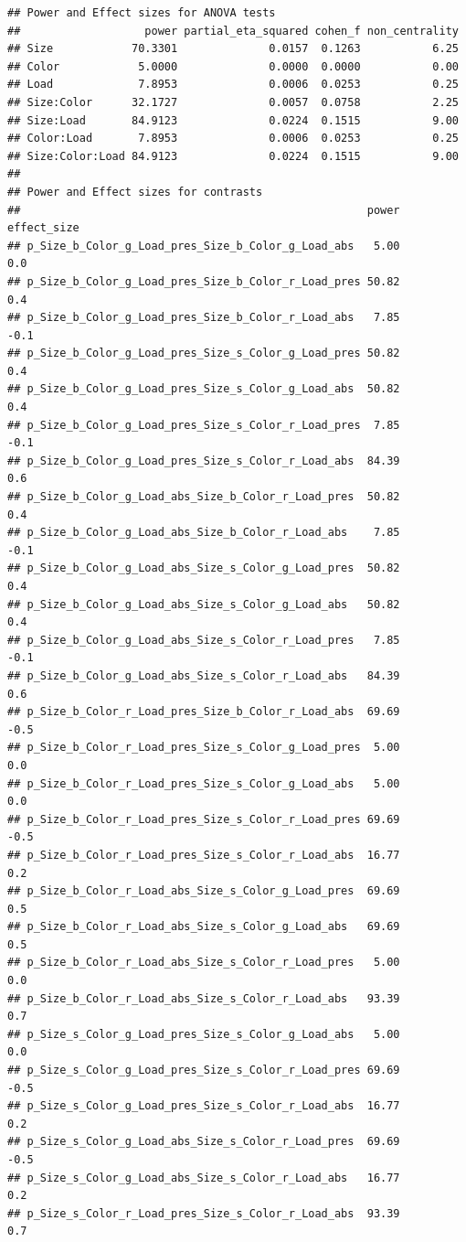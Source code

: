 \documentclass[]{book}
\begin{document}
\begin{verbatim}
## Power and Effect sizes for ANOVA tests
##                   power partial_eta_squared cohen_f non_centrality
## Size            70.3301              0.0157  0.1263           6.25
## Color            5.0000              0.0000  0.0000           0.00
## Load             7.8953              0.0006  0.0253           0.25
## Size:Color      32.1727              0.0057  0.0758           2.25
## Size:Load       84.9123              0.0224  0.1515           9.00
## Color:Load       7.8953              0.0006  0.0253           0.25
## Size:Color:Load 84.9123              0.0224  0.1515           9.00
## 
## Power and Effect sizes for contrasts
##                                                     power effect_size
## p_Size_b_Color_g_Load_pres_Size_b_Color_g_Load_abs   5.00         0.0
## p_Size_b_Color_g_Load_pres_Size_b_Color_r_Load_pres 50.82         0.4
## p_Size_b_Color_g_Load_pres_Size_b_Color_r_Load_abs   7.85        -0.1
## p_Size_b_Color_g_Load_pres_Size_s_Color_g_Load_pres 50.82         0.4
## p_Size_b_Color_g_Load_pres_Size_s_Color_g_Load_abs  50.82         0.4
## p_Size_b_Color_g_Load_pres_Size_s_Color_r_Load_pres  7.85        -0.1
## p_Size_b_Color_g_Load_pres_Size_s_Color_r_Load_abs  84.39         0.6
## p_Size_b_Color_g_Load_abs_Size_b_Color_r_Load_pres  50.82         0.4
## p_Size_b_Color_g_Load_abs_Size_b_Color_r_Load_abs    7.85        -0.1
## p_Size_b_Color_g_Load_abs_Size_s_Color_g_Load_pres  50.82         0.4
## p_Size_b_Color_g_Load_abs_Size_s_Color_g_Load_abs   50.82         0.4
## p_Size_b_Color_g_Load_abs_Size_s_Color_r_Load_pres   7.85        -0.1
## p_Size_b_Color_g_Load_abs_Size_s_Color_r_Load_abs   84.39         0.6
## p_Size_b_Color_r_Load_pres_Size_b_Color_r_Load_abs  69.69        -0.5
## p_Size_b_Color_r_Load_pres_Size_s_Color_g_Load_pres  5.00         0.0
## p_Size_b_Color_r_Load_pres_Size_s_Color_g_Load_abs   5.00         0.0
## p_Size_b_Color_r_Load_pres_Size_s_Color_r_Load_pres 69.69        -0.5
## p_Size_b_Color_r_Load_pres_Size_s_Color_r_Load_abs  16.77         0.2
## p_Size_b_Color_r_Load_abs_Size_s_Color_g_Load_pres  69.69         0.5
## p_Size_b_Color_r_Load_abs_Size_s_Color_g_Load_abs   69.69         0.5
## p_Size_b_Color_r_Load_abs_Size_s_Color_r_Load_pres   5.00         0.0
## p_Size_b_Color_r_Load_abs_Size_s_Color_r_Load_abs   93.39         0.7
## p_Size_s_Color_g_Load_pres_Size_s_Color_g_Load_abs   5.00         0.0
## p_Size_s_Color_g_Load_pres_Size_s_Color_r_Load_pres 69.69        -0.5
## p_Size_s_Color_g_Load_pres_Size_s_Color_r_Load_abs  16.77         0.2
## p_Size_s_Color_g_Load_abs_Size_s_Color_r_Load_pres  69.69        -0.5
## p_Size_s_Color_g_Load_abs_Size_s_Color_r_Load_abs   16.77         0.2
## p_Size_s_Color_r_Load_pres_Size_s_Color_r_Load_abs  93.39         0.7
\end{verbatim}
\end{document}
